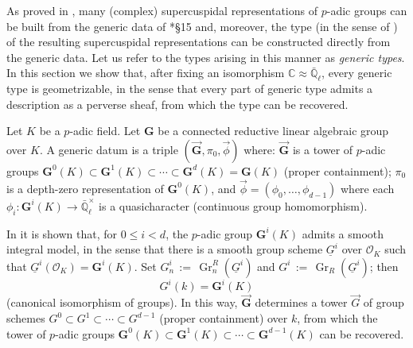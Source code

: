 \documentclass[10pt]{amsart}
\theoremstyle{plain}
\theoremstyle{definition}
\newcommand{\CC}{{\mathbb{C}}}
\newcommand{\EE}{\mathbb{\bar Q}_\ell}
\newcommand{\OK}{\mathcal{O}_K}
\newcommand{\Fq}{k}
\newcommand{\EEx}{\EE^\times}
\newcommand{\G}{\textbf{G}}
\DeclareMathOperator{\Gr}{Gr}
\newcommand{\ceq}{{\, :=\, }}
\begin{document}
 


As proved in \cite{kim:07a}, many (complex) supercuspidal representations of $p$-adic groups can be built from the generic data of \cite{yu:01a}*{\S 15} and, moreover, the type (in the sense of \cite{bushnell-kutzko:98a}) of the resulting supercuspidal representations can be constructed directly from the generic data. 
Let us refer to the types arising in this manner as {\it generic types}.
In this section we show that, after fixing an isomorphism $\CC \approx \EE$, every generic type is geometrizable, in the sense that every part of generic type admits a description as a perverse sheaf, from which the type can be recovered.

Let $K$ be a $p$-adic field. Let $\G$ be a connected reductive linear algebraic group over $K$. 
A generic datum is a triple $(\vec{\G}, \pi_0, \vec{\phi})$ where: $\vec{\G}$ is a tower of $p$-adic groups $\G^0(K) \subset \G^1(K) \subset \cdots  \subset \G^d(K) = \G(K)$ (proper containment); $\pi_0$ is a depth-zero representation of $\G^0(K)$, and $\vec{\phi} = (\phi_0, \ldots , \phi_{d-1})$ where each $\phi_i : \G^i(K) \to \EEx$ is a quasicharacter (continuous group homomorphism).  


In \cite{yu:03a} it is shown that, for $0 \leq i < d$, the $p$-adic group $\G^i(K)$ admits a smooth integral model, in the sense that there is a smooth group scheme $\underline{G}^i$ over $\OK$ such that $\underline{G}^i(\OK) = \G^i(K)$.
Set $G^i_n \ceq \Gr^R_n(\underline{G}^i)$ and $G^i \ceq \Gr_R(\underline{G}^i)$; 
then \[G^i(\Fq) = \G^i(K)\] (canonical isomorphism of groups).
In this way, $\vec{\G}$ determines a tower $\vec{G}$ of group schemes $G^0 \subset G^1 \subset \cdots  \subset G^{d-1}$ (proper containment) over $\Fq$, from which the tower of $p$-adic groups
$\G^0(K) \subset \G^1(K) \subset \cdots  \subset \G^{d-1}(K)$ can be recovered.
\end{document}
